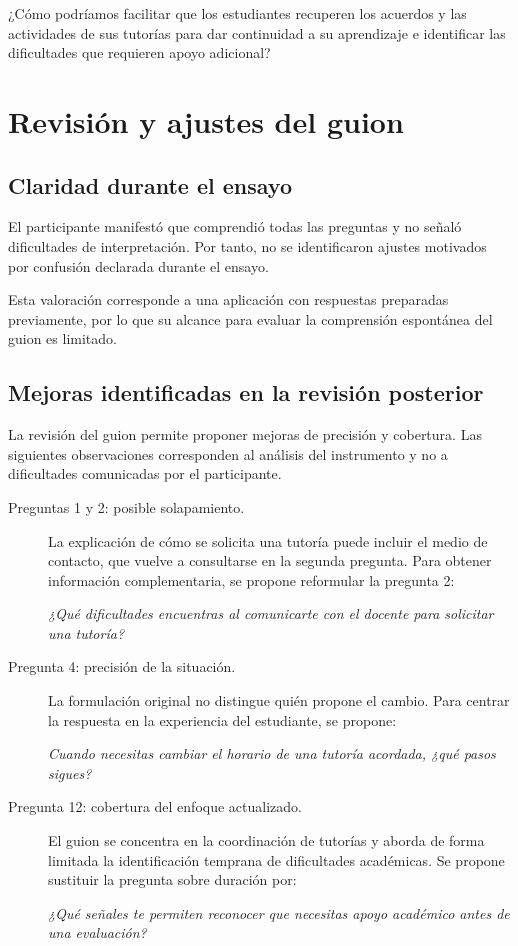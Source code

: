 \documentclass[11pt,a4paper]{article}
\begin{document}
¿Cómo podríamos facilitar que los estudiantes recuperen
los acuerdos y las actividades de sus tutorías para
dar continuidad a su aprendizaje e identificar las
dificultades que requieren apoyo adicional?

\section{Revisión y ajustes del guion}

\subsection{Claridad durante el ensayo}

El participante manifestó que comprendió todas las preguntas
y no señaló dificultades de interpretación. Por tanto,
no se identificaron ajustes motivados por confusión
declarada durante el ensayo.

Esta valoración corresponde a una aplicación con respuestas
preparadas previamente, por lo que su alcance para evaluar
la comprensión espontánea del guion es limitado.

\subsection{Mejoras identificadas en la revisión posterior}

La revisión del guion permite proponer mejoras de precisión
y cobertura. Las siguientes observaciones corresponden
al análisis del instrumento y no a dificultades comunicadas
por el participante.

\begin{description}
    \item[Preguntas 1 y 2: posible solapamiento.]
    La explicación de cómo se solicita una tutoría puede
    incluir el medio de contacto, que vuelve a consultarse
    en la segunda pregunta. Para obtener información
    complementaria, se propone reformular la pregunta 2:

    \emph{¿Qué dificultades encuentras al comunicarte
    con el docente para solicitar una tutoría?}

    \item[Pregunta 4: precisión de la situación.]
    La formulación original no distingue quién propone
    el cambio. Para centrar la respuesta en la experiencia
    del estudiante, se propone:

    \emph{Cuando necesitas cambiar el horario de una
    tutoría acordada, ¿qué pasos sigues?}

    \item[Pregunta 12: cobertura del enfoque actualizado.]
    El guion se concentra en la coordinación de tutorías
    y aborda de forma limitada la identificación temprana
    de dificultades académicas. Se propone sustituir
    la pregunta sobre duración por:

    \emph{¿Qué señales te permiten reconocer que necesitas
    apoyo académico antes de una evaluación?}
\end{description}
\end{document}
